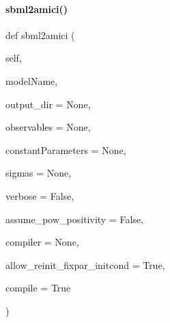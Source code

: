\paragraph{\texorpdfstring{sbml2amici()}{sbml2amici()}}
{\footnotesize\ttfamily def sbml2amici (\begin{DoxyParamCaption}\item[{}]{self,  }\item[{}]{model\+Name,  }\item[{}]{output\+\_\+dir = {\ttfamily None},  }\item[{}]{observables = {\ttfamily None},  }\item[{}]{constant\+Parameters = {\ttfamily None},  }\item[{}]{sigmas = {\ttfamily None},  }\item[{}]{verbose = {\ttfamily False},  }\item[{}]{assume\+\_\+pow\+\_\+positivity = {\ttfamily False},  }\item[{}]{compiler = {\ttfamily None},  }\item[{}]{allow\+\_\+reinit\+\_\+fixpar\+\_\+initcond = {\ttfamily True},  }\item[{}]{compile = {\ttfamily True} }\end{DoxyParamCaption})}


